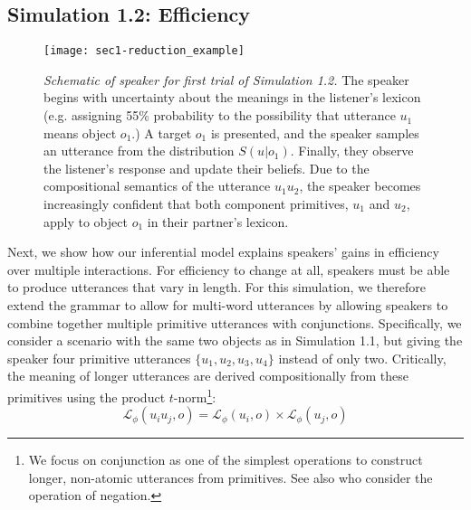 \subsection{Simulation 1.2: Efficiency}

\begin{figure*}
\centering
    \texttt{[image: sec1-reduction\_example]}
    \vspace{1em}
  \caption{\emph{Schematic of speaker for first trial of Simulation 1.2.} The speaker begins with uncertainty about the meanings in the listener's lexicon (e.g. assigning 55\% probability to the possibility that utterance $u_1$ means object $o_1$.) A target $o_1$ is presented, and the speaker samples an utterance from the distribution $S(u|o_1)$. Finally, they observe the listener's response and update their beliefs. Due to the compositional semantics of the utterance $u_1u_2$, the speaker becomes increasingly confident that both component primitives, $u_1$ and $u_2$, apply to object $o_1$ in their partner's lexicon.}
  \label{fig:sec1efficiency}
\end{figure*}

Next, we show how our inferential model explains speakers' gains in efficiency over multiple interactions. 
For efficiency to change at all, speakers must be able to produce utterances that vary in length. 
For this simulation, we therefore extend the grammar to allow for multi-word utterances by allowing speakers to combine together multiple primitive utterances with conjunctions.
Specifically, we consider a scenario with the same two objects as in Simulation 1.1, but giving the speaker four primitive utterances $\{u_1, u_2, u_3, u_4\}$ instead of only two. 
Critically, the meaning of longer utterances are derived compositionally from these primitives using the product $t$-norm\footnote{We focus on conjunction as one of the simplest operations to construct longer, non-atomic utterances from primitives. See also  who consider the operation of negation.}:
$$\mathcal{L}_\phi(u_iu_j, o) = \mathcal{L}_\phi(u_i, o) \times \mathcal{L}_\phi(u_j, o)$$


